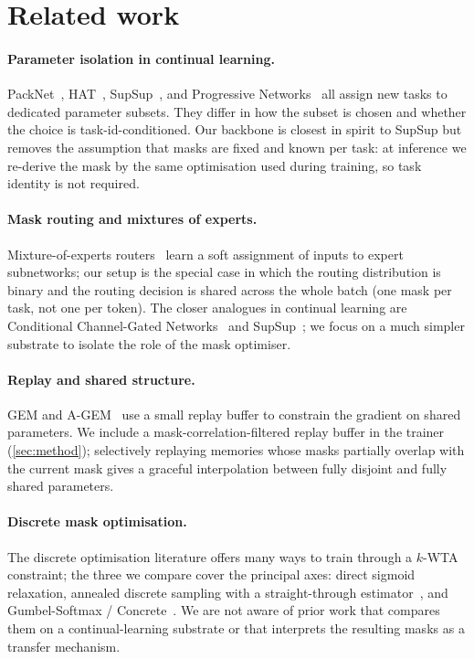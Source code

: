 \documentclass{article}
\theoremstyle{plain}
\theoremstyle{remark}
\begin{document}
\section{Related work}
\label{sec:related}

\paragraph{Parameter isolation in continual learning.}
PackNet~\citep{mallya2018packnet}, HAT~\citep{serra2018overcoming},
SupSup~\citep{wortsman2020supermasks}, and Progressive
Networks~\citep{rusu2016progressive} all assign new tasks to dedicated
parameter subsets. They differ in how the subset is chosen and whether
the choice is task-id-conditioned. Our backbone is closest in spirit to
SupSup but removes the assumption that masks are fixed and known per
task: at inference we re-derive the mask by the same optimisation used
during training, so task identity is not required.

\paragraph{Mask routing and mixtures of experts.}
Mixture-of-experts routers~\citep{shazeer2017outrageously,
fedus2022switch} learn a soft assignment of inputs to expert
subnetworks; our setup is the special case in which the routing
distribution is binary and the routing decision is shared across the
whole batch (one mask per task, not one per token). The closer
analogues in continual learning are Conditional
Channel-Gated Networks~\citep{abati2020conditional} and
SupSup~\citep{wortsman2020supermasks}; we focus on a much simpler
substrate to isolate the role of the mask optimiser.

\paragraph{Replay and shared structure.}
GEM and A-GEM~\citep{lopez2017gradient, chaudhry2018efficient} use a
small replay buffer to constrain the gradient on shared parameters. We
include a mask-correlation-filtered replay buffer in the trainer
(\cref{sec:method}); selectively replaying memories whose masks partially
overlap with the current mask gives a graceful interpolation between
fully disjoint and fully shared parameters.

\paragraph{Discrete mask optimisation.}
The discrete optimisation literature offers many ways to train through a
$k$-WTA constraint; the three we compare cover the principal axes:
direct sigmoid relaxation, annealed
discrete sampling with a straight-through
estimator~\citep{bengio2013estimating}, and Gumbel-Softmax /
Concrete~\citep{jang2017categorical, maddison2017concrete}. We are not
aware of prior work that compares them on a continual-learning
substrate or that interprets the resulting masks as a transfer
mechanism.
\end{document}
